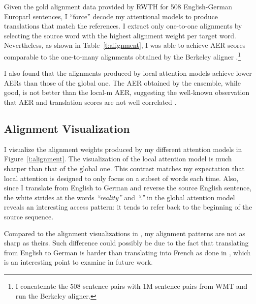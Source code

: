 Given the gold alignment data provided by RWTH for 508 English-German
Europarl sentences, I ``force'' decode my attentional models to
produce translations that match the references. I extract only one-to-one
alignments by selecting the source word with the highest alignment
weight per target word. Nevertheless, as shown in Table~\ref{t:alignment}, I was able to achieve AER scores
comparable to the one-to-many alignments obtained by the Berkeley aligner
\cite{liang06alignment}.\footnote{I concatenate the 508 sentence pairs with 1M
sentence pairs from WMT and run the Berkeley aligner.}

I also found that the alignments produced by local attention models achieve
lower AERs than those of the global one. The AER obtained by the ensemble, while
good, is not better than the local-m AER, suggesting the well-known
observation that AER and translation scores are not well correlated \cite{fraser07}.

\subsection{Alignment Visualization}
I visualize the alignment weights produced by my different attention
models in Figure~\ref{i:alignment}. The visualization of the local
attention model is much sharper than that of the global one. This contrast matches
my expectation that local attention is designed to only focus on a subset of
words each time. Also, since I
translate from English to German and reverse the source English sentence, the white strides
at the words {\it ``reality''} and {\it ``.''} in the global attention model reveals an
interesting access pattern: it tends to refer back to the beginning of the
source sequence. 

Compared to the alignment visualizations in \cite{bog15}, my 
alignment patterns are not as sharp as theirs. Such difference could possibly be due to
the fact that translating from English to German is
harder than translating into French as done in \cite{bog15},
which is an interesting point to examine in future work.

